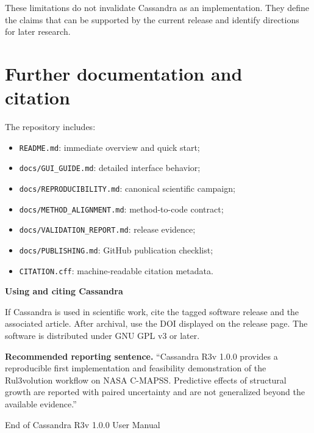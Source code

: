 \documentclass[11pt,a4paper]{article}
\begin{document}
These limitations do not invalidate Cassandra as an implementation. They define
the claims that can be supported by the current release and identify directions
for later research.

\section{Further documentation and citation}

The repository includes:

\begin{itemize}
  \item \texttt{README.md}: immediate overview and quick start;
  \item \texttt{docs/GUI\_GUIDE.md}: detailed interface behavior;
  \item \texttt{docs/REPRODUCIBILITY.md}: canonical scientific campaign;
  \item \texttt{docs/METHOD\_ALIGNMENT.md}: method-to-code contract;
  \item \texttt{docs/VALIDATION\_REPORT.md}: release evidence;
  \item \texttt{docs/PUBLISHING.md}: GitHub publication checklist;
  \item \texttt{CITATION.cff}: machine-readable citation metadata.
\end{itemize}

\clearpage
\thispagestyle{empty}
\pagecolor{CassandraLight}
\vspace*{\fill}

\begin{center}
{\LARGE\bfseries\textcolor{CassandraBlue}{Using and citing Cassandra}}\\[4mm]
\end{center}

If Cassandra is used in scientific work, cite the tagged software release and
the associated article. After archival, use the DOI displayed on the release
page. The software is distributed under GNU GPL v3 or later.

\begin{importantbox}[colback=white]
\textbf{Recommended reporting sentence.} ``Cassandra R3v 1.0.0 provides a
reproducible first implementation and feasibility demonstration of the
Rul3volution workflow on NASA C-MAPSS. Predictive effects of structural growth
are reported with paired uncertainty and are not generalized beyond the
available evidence.''
\end{importantbox}

\vfill
\begin{center}
\textcolor{CassandraGray}{\small End of Cassandra R3v 1.0.0 User Manual}
\end{center}
\nopagecolor
\end{document}
